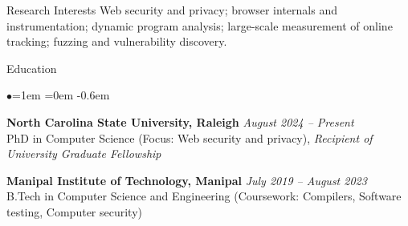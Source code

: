 \documentclass{resume} %
\date{\today}
\begin{document}
\vspace{-1em}
\begin{rSection}{Research Interests}
Web security and privacy; browser internals and instrumentation; dynamic program analysis; large-scale measurement of online tracking; fuzzing and vulnerability discovery.
\end{rSection}
\begin{rSection}{Education}
\begin{list}{$\bullet$}{\leftmargin=1em \itemindent=0em}
\itemsep -0.6em
\item {\bf North Carolina State University, Raleigh} \hfill {\em August 2024 -- Present}  \\ PhD in Computer Science (Focus: Web security and privacy), \it{Recipient of University Graduate Fellowship} \hfill
\item {\bf Manipal Institute of Technology, Manipal} \hfill {\em July 2019 -- August 2023}  \\ B.Tech in Computer Science and Engineering (Coursework: Compilers, Software testing, Computer security) \hfill
\end{list}
\end{rSection}
\printbibliography[heading=none]
\end{document}
